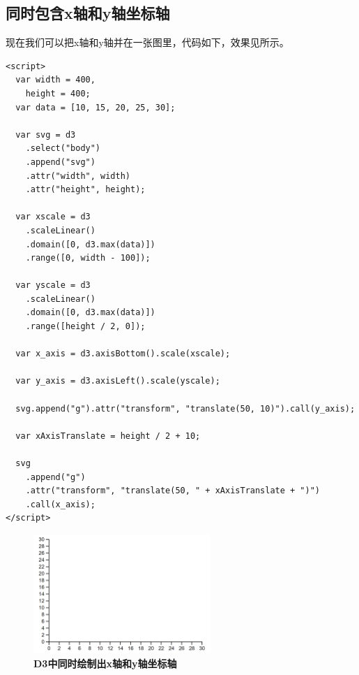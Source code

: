 \subsection{同时包含x轴和y轴坐标轴}

现在我们可以把x轴和y轴并在一张图里，代码如下，效果见所示。

\begin{verbatim}
<script>
  var width = 400,
    height = 400;
  var data = [10, 15, 20, 25, 30];

  var svg = d3
    .select("body")
    .append("svg")
    .attr("width", width)
    .attr("height", height);

  var xscale = d3
    .scaleLinear()
    .domain([0, d3.max(data)])
    .range([0, width - 100]);

  var yscale = d3
    .scaleLinear()
    .domain([0, d3.max(data)])
    .range([height / 2, 0]);

  var x_axis = d3.axisBottom().scale(xscale);

  var y_axis = d3.axisLeft().scale(yscale);

  svg.append("g").attr("transform", "translate(50, 10)").call(y_axis);

  var xAxisTranslate = height / 2 + 10;

  svg
    .append("g")
    .attr("transform", "translate(50, " + xAxisTranslate + ")")
    .call(x_axis);
</script>
\end{verbatim}

\begin{figure}[htbp]
    \centering
    \includegraphics[width=0.6\textwidth]{figure/D3/axis_xy.png}
    \caption{\textbf{D3中同时绘制出x轴和y轴坐标轴}}
    \label{fig:axis_xy}
\end{figure}